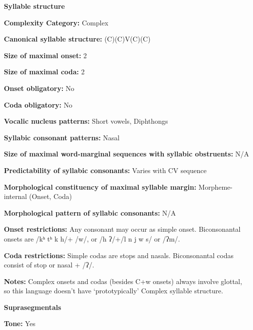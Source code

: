 \textbf{Syllable structure}



\textbf{Complexity Category:} Complex



\textbf{Canonical syllable structure:} (C)(C)V(C)(C) \citep[124-34]{Eberhard2009}



\textbf{Size of maximal onset:} 2



\textbf{Size of maximal coda:} 2



\textbf{Onset obligatory:} No



\textbf{Coda obligatory:} No



\textbf{Vocalic nucleus patterns:} Short vowels, Diphthongs



\textbf{Syllabic consonant patterns:} Nasal



\textbf{Size of maximal word{}-marginal sequences with syllabic obstruents:} N/A



\textbf{Predictability of syllabic consonants:} Varies with CV sequence



\textbf{Morphological constituency of maximal syllable margin:} Morpheme-internal (Onset, Coda)



\textbf{Morphological pattern of syllabic consonants:} N/A



\textbf{Onset restrictions:} Any consonant may occur as simple onset. Biconsonantal onsets are /kʰ tʰ k h/+ /w/, or /h ʔ/+/l n j w s/ or /ʔm/.



\textbf{Coda restrictions:} Simple codas are stops and nasals. Biconsonantal codas consist of stop or nasal + /ʔ/.



\textbf{Notes:} Complex onsets and codas (besides C+w onsets) always involve glottal, so this language doesn’t have ‘prototypically’ Complex syllable structure.



\textbf{Suprasegmentals}



\textbf{Tone:} Yes



